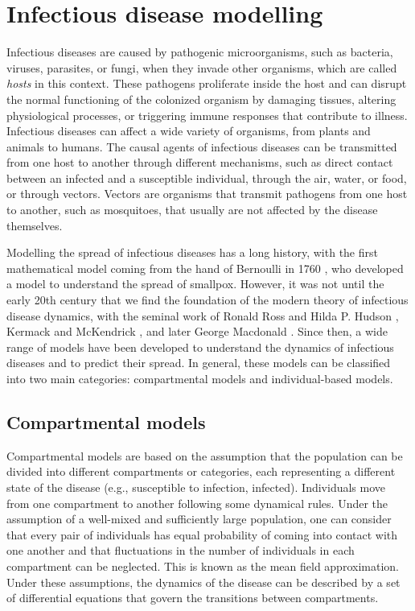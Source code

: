 \section{\label{sec:Infectious disease modelling} Infectious
  disease modelling}

Infectious diseases are caused by pathogenic microorganisms, such as
bacteria, viruses, parasites, or fungi, when they invade other organisms, which
are called \textit{hosts} in this context. These pathogens proliferate inside
the host and can disrupt the normal functioning of the colonized organism by
damaging tissues, altering physiological processes, or triggering immune
responses that contribute to illness. Infectious diseases can affect a wide
variety of organisms, from plants and animals to humans. The causal agents of
infectious diseases can be transmitted from one host to another through
different mechanisms, such as direct contact between an infected and a
susceptible individual, through the air, water, or food, or through vectors.
Vectors are organisms that transmit pathogens from one host to another, such as
mosquitoes, that usually are not affected by the disease themselves.

Modelling the spread of infectious diseases has a long history, with the first
mathematical model coming from the hand of Bernoulli in 1760
\cite{Bernoulli1760}, who developed a model to understand the spread of
smallpox. However, it was not until the early 20th century that we find the
foundation of the modern theory of infectious disease dynamics, with the
seminal work of Ronald Ross and Hilda P. Hudson
\cite{Ross1916,Ross1917,Ross1917_2}, Kermack and McKendrick
\cite{McKendrick}, and later George Macdonald \cite{Macdonald1957}. Since then,
a wide range of models have been developed to understand the dynamics of
infectious diseases and to predict their spread. In general, these models can
be classified into two main categories: compartmental models and
individual-based models.

\subsection{\label{sec:Compartmental models} Compartmental models}

Compartmental models are based on the assumption that the population can be
divided into different compartments or categories, each representing a
different state of the disease (e.g., susceptible to infection, infected).
Individuals move from one compartment to another following some dynamical
rules. Under the assumption of a well-mixed and sufficiently large population,
one can consider that  every pair of individuals has equal probability of
coming into contact with one another and that fluctuations in the number of
individuals in each compartment can be neglected. This is known as the mean
field approximation. Under these assumptions, the dynamics of the disease can
be described by a set of differential equations that govern the transitions
between compartments.

